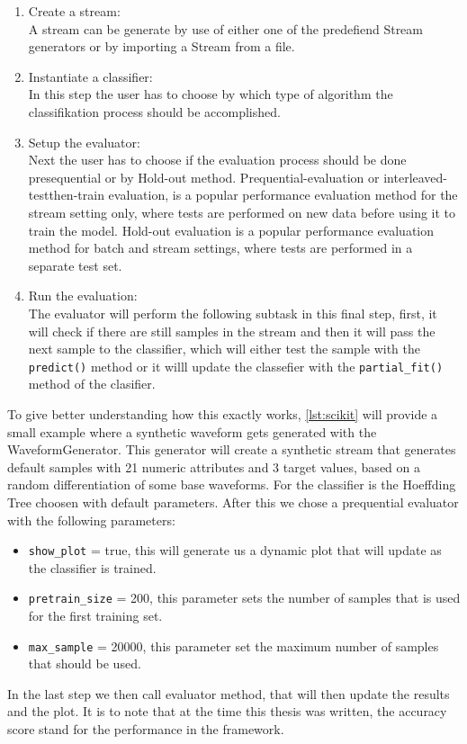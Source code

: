 \documentclass[12pt,oneside,a4paper,parskip]{scrbook}
\begin{document}
\begin{enumerate}
  \item Create a stream: \\
        A stream can be generate by use of either one of the predefiend Stream generators or by importing a Stream from a file.
  \item Instantiate a classifier: \\
        In this step the user has to choose by which type of algorithm the classifikation process should be accomplished.
  \item Setup the evaluator: \\
        Next the user has to choose if the evaluation process should be done presequential or by Hold-out method.
  Prequential-evaluation or interleaved-testthen-train evaluation, is a popular performance 
  evaluation method for the stream setting only, where tests are performed on new data before using it to train the model.
  Hold-out evaluation is a popular performance evaluation method for batch and stream settings, where tests are performed 
  in a separate test set. \cite{skmultiflow}
  \item Run the evaluation: \\
        The evaluator will perform the following subtask in this final step,
  first, it will check if there are still samples in the stream and then it will pass the next sample to the classifier,
  which will either test the sample with the \verb|predict()| method or it willl update the classefier with the \verb|partial_fit()|
  method of the clasifier.
\end{enumerate}
  
To give better understanding how this exactly works, \ref{lst:scikit} will provide a small example where a synthetic waveform gets 
generated with the WaveformGenerator. This generator will create a synthetic stream that generates default samples with
21 numeric attributes and 3 target values, based on a random differentiation of some base waveforms.
For the classifier is the Hoeffding Tree choosen with default parameters.
After this we chose a prequential evaluator with the following parameters: 
\begin{itemize}
  \item \verb|show_plot| = true, this will generate us a dynamic plot that will update as the classifier is trained.
  \item \verb|pretrain_size| = 200, this parameter sets the number of samples that is used for the first training set.
  \item \verb|max_sample| = 20000, this parameter set the maximum number of samples that should be used.
\end{itemize}
In the last step we then call evaluator method, that will then update the results and the plot.
It is to note that at the time this thesis was written, the accuracy score stand for the performance 
in the framework.  \cite{skmultiflow}
\end{document}
